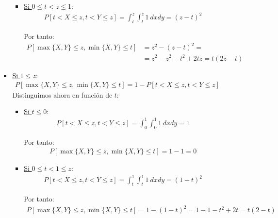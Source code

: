 \documentclass[12pt]{article}
\begin{document}
\begin{ejercicio}
\begin{enumerate}
\begin{itemize}
\begin{itemize}
\begin{itemize}
                        \item \ul{Si $0\leq t<z\leq 1$}:
                        \begin{align*}
                            P[t<X\leq z,t<Y\leq z] = \int_t^z\int_t^z 1\ dxdy = (z-t)^2
                        \end{align*}

                        Por tanto:
                        \begin{align*}
                            P[\max\{X,Y\}\leq z, \min\{X,Y\}\leq t]
                            &= z^2- (z-t)^2
                            =\\&= z^2-z^2-t^2+2tz = t(2z-t)
                        \end{align*}
                    \end{itemize}

                    \item \ul{Si $1\leq z$}:
                    \begin{align*}
                        P[\max\{X,Y\}\leq z, \min\{X,Y\}\leq t]
                        = 1- P[t<X\leq z,t<Y\leq z]
                    \end{align*}
                    Distinguimos ahora en función de $t$:
                    \begin{itemize}
                        \item \ul{Si $t\leq 0$}:
                        \begin{align*}
                            P[t<X\leq z,t<Y\leq z] = \int_0^1\int_0^1 1\ dxdy = 1
                        \end{align*}

                        Por tanto:
                        \begin{align*}
                            P[\max\{X,Y\}\leq z, \min\{X,Y\}\leq t]
                            = 1-1=0
                        \end{align*}

                        \item \ul{Si $0\leq t<1\leq z$}:
                        \begin{align*}
                            P[t<X\leq z,t<Y\leq z] = \int_t^1\int_t^1 1\ dxdy = (1-t)^2
                        \end{align*}

                        Por tanto:
                        \begin{align*}
                            P[\max\{X,Y\}\leq z, \min\{X,Y\}\leq t]
                            = 1- (1-t)^2
                            = 1-1-t^2+2t = t(2-t)
                        \end{align*}


\end{itemize}
\end{itemize}
\end{itemize}
\end{enumerate}
\end{ejercicio}
\end{document}
